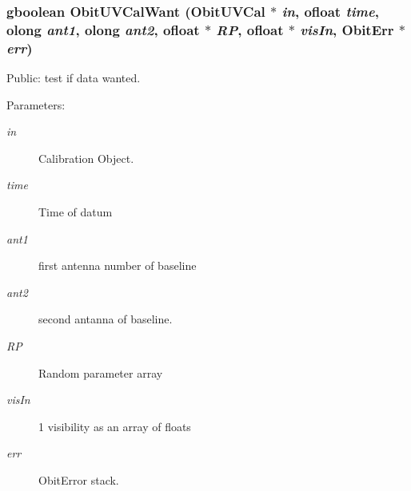 \subsubsection{\setlength{\rightskip}{0pt plus 5cm}gboolean Obit\-UVCal\-Want ({\bf Obit\-UVCal} $\ast$ {\em in}, {\bf ofloat} {\em time}, {\bf olong} {\em ant1}, {\bf olong} {\em ant2}, {\bf ofloat} $\ast$ {\em RP}, {\bf ofloat} $\ast$ {\em vis\-In}, {\bf Obit\-Err} $\ast$ {\em err})}\label{ObitUVCal_8h_a16}


Public: test if data wanted. 

\begin{Desc}
\item[Parameters:]
\begin{description}
\item[{\em in}]Calibration Object. \item[{\em time}]Time of datum \item[{\em ant1}]first antenna number of baseline \item[{\em ant2}]second antanna of baseline. \item[{\em RP}]Random parameter array \item[{\em vis\-In}]1 visibility as an array of floats \item[{\em err}]Obit\-Error stack. \end{description}
\end{Desc}
